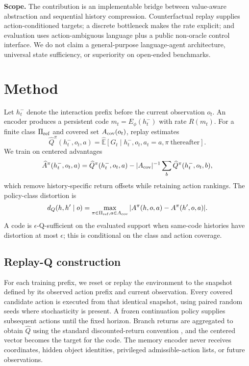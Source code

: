\documentclass{article}
\begin{document}
\textbf{Scope.} The contribution is an implementable bridge between value-aware abstraction and sequential history compression. Counterfactual replay supplies action-conditioned targets; a discrete bottleneck makes the rate explicit; and evaluation uses action-ambiguous language plus a public non-oracle control interface. We do not claim a general-purpose language-agent architecture, universal state sufficiency, or superiority on open-ended benchmarks.

\section{Method}
Let $h_t^-$ denote the interaction prefix before the current observation $o_t$. An encoder produces a persistent code $m_t=E_\phi(h_t^-)$ with rate $R(m_t)$. For a finite class $\Pi_{\rm ref}$ and covered set $A_{\rm cov}(o_t)$, replay estimates
\begin{equation}
\widehat Q^\pi(h_t^-,o_t,a)=\widehat{\mathbb E}[G_t\mid h_t^-,o_t,a_t=a,\pi\ \text{thereafter}].
\end{equation}
We train on centered advantages
\begin{equation}
\widehat A^\pi(h_t^-,o_t,a)=\widehat Q^\pi(h_t^-,o_t,a)-|A_{\rm cov}|^{-1}\sum_b\widehat Q^\pi(h_t^-,o_t,b),
\end{equation}
which remove history-specific return offsets while retaining action rankings. The policy-class distortion is
\begin{equation}
d_Q(h,h'\mid o)=\max_{\pi\in\Pi_{\rm ref},a\in A_{\rm cov}}|A^\pi(h,o,a)-A^\pi(h',o,a)|.
\end{equation}
A code is $\epsilon$-Q-sufficient on the evaluated support when same-code histories have distortion at most $\epsilon$; this is conditional on the class and action coverage.

\subsection{Replay-Q construction}
For each training prefix, we reset or replay the environment to the snapshot defined by its observed action prefix and current observation. Every covered candidate action is executed from that identical snapshot, using paired random seeds where stochasticity is present. A frozen continuation policy supplies subsequent actions until the fixed horizon. Branch returns are aggregated to obtain $\widehat Q$ using the standard discounted-return convention \cite{sutton2018rl}, and the centered vector becomes the target for the code. The memory encoder never receives coordinates, hidden object identities, privileged admissible-action lists, or future observations.
\end{document}
